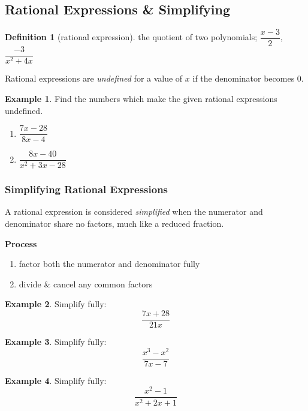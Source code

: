 \documentclass[addpoints,12pt]{exam}
\theoremstyle{definition}
\newtheorem{example}{Example}[subsection]
\newtheorem{definition}{Definition}[subsection]
\begin{document}
\setcounter{section}{7}
\setcounter{subsection}{0}

\subsection{Rational Expressions \& Simplifying}

\begin{mdframed}
\begin{definition}[rational expression]
the quotient of two polynomials; $\dfrac{x-3}{2}$, $\dfrac{-3}{x^2+4x}$
\end{definition}
\end{mdframed}
\vspace{.25in}

\noindent Rational expressions are \emph{undefined} for a value of $x$ if the denominator becomes 0.

\vspace{.25in}

\begin{example}
Find the numbers which make the given rational expressions undefined.
\begin{enumerate}
\item $\dfrac{7x-28}{8x-4}$
\vspace{1.25in}
\item $\dfrac{8x-40}{x^2+3x-28}$
\vspace{1.25in}
\end{enumerate}
\end{example}

\subsubsection*{Simplifying Rational Expressions}
\noindent A rational expression is considered \emph{simplified} when the numerator and denominator share no factors, much like a reduced fraction.

\vspace{.25in}
\begin{mdframed}
\textbf{Process}
\begin{enumerate}
\item factor both the numerator and denominator fully
\item divide \& cancel any common factors
\end{enumerate}
\end{mdframed}

\newpage

\begin{example}
Simplify fully: \[\dfrac{7x+28}{21x}\]
\vspace{1.5in}
\end{example}
\begin{example}
Simplify fully: \[\dfrac{x^3-x^2}{7x-7}\]
\vspace{1.5in}
\end{example}
\begin{example}
Simplify fully: \[\dfrac{x^2-1}{x^2+2x+1}\]
\vspace{1.5in}
\end{example}
\end{document}
